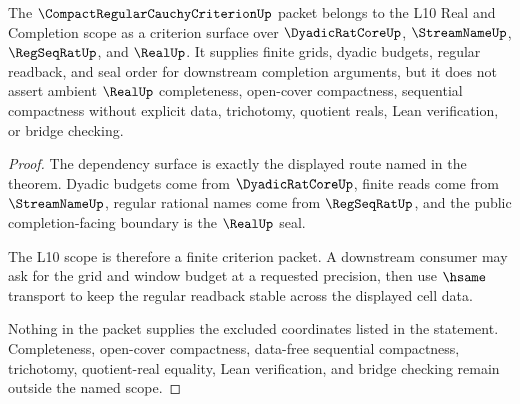 \begin{theorem}
\label{thm:compact-regular-cauchy-criterion-l10-scope}
The $\CompactRegularCauchyCriterionUp$ packet belongs to the L10 Real and Completion scope as a criterion surface over $\DyadicRatCoreUp$, $\StreamNameUp$, $\RegSeqRatUp$, and $\RealUp$. It supplies finite grids, dyadic budgets, regular readback, and seal order for downstream completion arguments, but it does not assert ambient $\RealUp$ completeness, open-cover compactness, sequential compactness without explicit data, trichotomy, quotient reals, Lean verification, or bridge checking.
\end{theorem}
\begin{proof}
The dependency surface is exactly the displayed route named in the theorem. Dyadic budgets come from $\DyadicRatCoreUp$, finite reads come from $\StreamNameUp$, regular rational names come from $\RegSeqRatUp$, and the public completion-facing boundary is the $\RealUp$ seal.

The L10 scope is therefore a finite criterion packet. A downstream consumer may ask for the grid and window budget at a requested precision, then use $\hsame$ transport to keep the regular readback stable across the displayed cell data.

Nothing in the packet supplies the excluded coordinates listed in the statement. Completeness, open-cover compactness, data-free sequential compactness, trichotomy, quotient-real equality, Lean verification, and bridge checking remain outside the named scope.
\end{proof}


\begin{closurestatus}{\CompactRegularCauchyCriterionUp}
  \theoryclosure{\seedClosure}
  \formalstatus{\unformalizedV}
\end{closurestatus}
